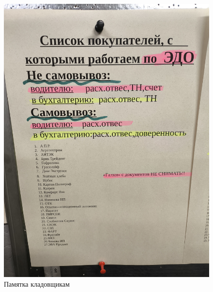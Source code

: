 \begin{figure}
\begin{center}
 \includegraphics[height=0.6\textheight, keepaspectratio]{Pics/IX памятка кладовщикам.jpg}
\end{center}
 \caption{Памятка кладовщикам}
 \label{pic:IX памятка кладовщикам}
\end{figure}

\clearpage


